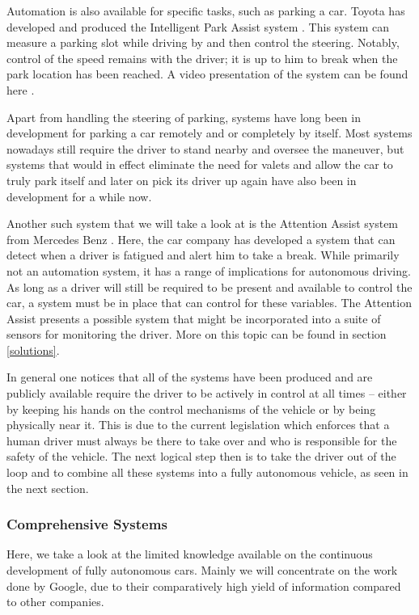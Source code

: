 \documentclass{acm_proc_article-sp}
\begin{document}
Automation is also available for specific tasks, such as parking a car.
Toyota has developed and produced the Intelligent Park Assist system \cite{www:toyota_i_park_assist}.
This system can measure a parking slot while driving by and then control the steering.
Notably, control of the speed remains with the driver; it is up to him to break when the park location has been reached.
A video presentation of the system can be found here \cite{www:toyota_ipa_video}.

Apart from handling the steering of parking, systems have long been in development for parking a car remotely and or completely by itself.
Most systems nowadays still require the driver to stand nearby and oversee the maneuver, but systems that would in effect eliminate the need for valets and allow the car to truly park itself and later on pick its driver up again have also been in development for a while now.

Another such system that we will take a look at is the Attention Assist system from Mercedes Benz \cite{www:mercedes_attention_assist}.
Here, the car company has developed a system that can detect when a driver is fatigued and alert him to take a break.
While primarily not an automation system, it has a range of implications for autonomous driving.
As long as a driver will still be required to be present and available to control the car, a system must be in place that can control for these variables.
The Attention Assist presents a possible system that might be incorporated into a suite of sensors for monitoring the driver.
More on this topic can be found in section \ref{solutions}.

In general one notices that all of the systems have been produced and are publicly available require the driver to be actively in control at all times – either by keeping his hands on the control mechanisms of the vehicle or by being physically near it.
This is due to the current legislation which enforces that a human driver must always be there to take over and who is responsible for the safety of the vehicle.
The next logical step then is to take the driver out of the loop and to combine all these systems into a fully autonomous vehicle, as seen in the next section.

\subsubsection{Comprehensive Systems}

Here, we take a look at the limited knowledge available on the continuous development of fully autonomous cars.
Mainly we will concentrate on the work done by Google, due to their comparatively high yield of information compared to other companies.
\end{document}
